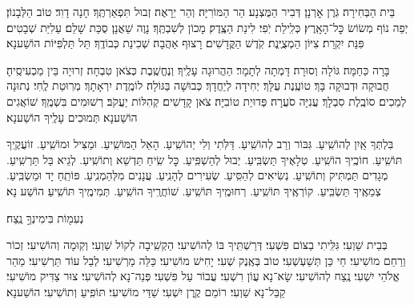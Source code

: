 \documentclass[twoside, openany, parskip=half, 11pt]{book}
\begin{document}

בֵּית הַבְּחִירָה׃ גֹּֽרֶן אׇרְנָן׃ דְּבִיר הַמֻּצְנָע׃ הַר הַמּוֹרִיָּה׃ וְהַר יֵרָאֶה׃ זְבוּל תִּפְאַרְתֶּֽךָ׃ חָנָה דָוִד׃ טוֹב הַלְּבָנוֹן׃ יְפֵה נוֹף מְשׂוֹשׂ כׇּל־הָאָֽרֶץ׃ כְּלִֽילַת יֹֽפִי׃ לִינַת הַצֶּֽדֶק׃ מָכוֹן לְשִׁבְתֶּֽךָ׃ נָוֶה שַׁאֲנָן׃ סֻכַּת שָׁלֵם׃ עַלִיַּת שְׁבָטִים׃ פִּנַּת יִקְרַת׃ צִיּוֹן הַמְצֻיֶּֽנֶת׃ קֹֽדֶשׁ הַקֳּדָשִׁים׃ רָצוּף אַהֲבָה׃
שְׁכִינַת כְּבוֹדֶֽךָ׃
תֵּל תַּלְפִּיּוֹת הוֹשַׁענָא׃


בָּרָה כַּחַמָּה׃ גּוֹלָה וְסוּרָה׃ דָּמְתָה לְתָמָר׃ הַהֲרוּגָה עָלֶֽיךָ׃ וְנֶחֱשֶֽׁבֶת כְּצֹאן טִבְחָה׃ זְרוּיָה בֵּין מַכְעִיסֶֽיהָ׃ חֲבוּקָה וּדְבוּקָה בָּךְ׃ טוֹעֶֽנֶת עֻלָּךְ׃ יְחִידָה לְיַחֲדָךְ׃ כְּבוּשָׁה בַּגּוֹלָה׃ לוֹמֶֽדֶת יִרְאָתָךְ׃ מְרֽוּטַת לֶֽחִי׃ נְתוּנָה לְמַכִים׃ סוֹבֶֽלֶת סִבְלָךְ׃ עֲנִיָּה סֹעֲרָה׃ פְּדוּיַת טוֹבִיָּה׃ צֹאן קָדָשִׁים׃ קְהִלּוֹת יַעֲקֹב׃ רְשׁוּמִים בִּשְׁמֶֽךָ׃
שׁוֹאֲגִים הוֹשַׁענָא׃
תְּמוּכִים עָלֶֽיךָ הוֹשַׁענָא׃


בִּלְתְּךָ אַֽיִן לְהוֹשִֽׁיעַ. גִּבּוֹר וְרַב לְהוֹשִֽׁיעַ. דַּלֹּֽתִי וְלִי יְהוֹשִֽׁיעַ. הָאֵל הַמּוֹשִֽׁיעַ. וּמַצִּיל וּמוֹשִֽׁיעַ. זוֹעֲקֶֽיךָ תּוֹשִֽׁיעַ. חוֹכֶֽיךָ הוֹשִֽׁיעַ. טְלָאֶיךָ תַּשְׂבִּֽיעַ. יְבוּל לְהַשְׁפִּֽיעַ. כׇּל שִֽׂיחַ תַּדְשֵׁא וְתוֹשִֽׁיעַ. לְגֵיא בַּל תַּרְשִֽׁיעַ. מְגָדִים תַּמְתִּיק וְתוֹשִֽׁיעַ. נְשִׂיאִים לְהַסִּֽיעַ. שְׂעִירִים לְהָנִֽיעַ. עֲנָנִים מִלְּהַמְנִֽיעַ. פּוֹתֵֽחַ יָד וּמַשְׂבִּֽיעַ. צְמֵאֶֽיךָ תַּשְׂבִּֽיעַ. קוֹרְאֶֽיךָ תּוֹשִֽׁיעַ. רְחוּמֶֽיךָ תּוֹשִֽׁיעַ. שׁוֹחֲרֶֽיךָ הוֹשִֽׁיעַ. תְּמִימֶֽיךָ תּוֹשִֽׁיעַ׃ הוֹשַׁע נָא׃

נְעִמ֖וֹת בִּימִינְךָ֣ נֶֽצַח׃

בְּבֵית שַׁוְעִי׃ גִּלִּֽיתִי בַצּוֹם פִּשְׁעִי׃ דְּרַשְׁתִּֽיךָ בּוֹ לְהוֹשִׁיעִי׃ הַקְשִֽׁיבָה לְקוֹל שַׁוְעִי׃ וְקֽוּמָה וְהוֹשִׁיעִי׃ זְכוֹר וְרַחֵם מוֹשִׁיעִי׃ חַי כֵּן תְּשַׁעְשְׁעִי׃ טוֹב בְּאֶֽנֶק שְׁעִי׃ יָחִישׁ מוֹשִׁיעִי׃ כַּלֵּה מַרְשִׁיעִי׃ לְבַל עוֹד תַּרְשִׁיעִי׃ מַהֵר אֱלֹהֵי יִשְׁעִי׃ נֶֽצַח לְהוֹשִׁיעִי׃ שָׂא־נָא עֲוֹן רִשְׁעִי׃ עֲבוֹר עַל פִּשְׁעִי׃ פְּנֵה־נָא לְהוֹשִׁיעִי׃ צוּר צַדִּיק מוֹשִׁיעִי׃ קַבֵּל־נָא שַׁוְעִי׃ רוֹמֵם קֶֽרֶן יִשְׁעִי׃
שַׁדַּי מוֹשִׁיעִי׃ תּוֹפִֽיעַ וְתוֹשִׁיעִי׃ הוֹשַׁענָא׃
\end{document}
